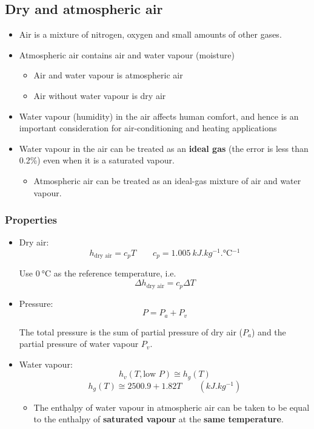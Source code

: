 \documentclass[11pt]{article}
\begin{document}
\subsection{Dry and atmospheric air}
\label{sec:orgee04d3c}
\begin{itemize}
\item Air is a mixture of nitrogen, oxygen and small amounts of other gases.
\item Atmospheric air contains air and water vapour (moisture)
\begin{itemize}
\item Air and water vapour is atmospheric air
\item Air without water vapour is dry air
\end{itemize}
\item Water vapour (humidity) in the air affects human comfort, and hence is an important consideration for air-conditioning and heating applications
\item Water vapour in the air can be treated as an \textbf{ideal gas} (the error is less than 0.2\%) even when it is a saturated vapour.
\begin{itemize}
\item Atmospheric air can be treated as an ideal-gas mixture of air and water vapour.
\end{itemize}
\end{itemize}

\subsubsection{Properties}
\label{sec:orgcea3372}
\begin{itemize}
\item Dry air:
\[h_{\text{dry air}} = c_p T \qquad c_p = \qty{1.005}{kJ.kg^{-1}.\degreeCelsius^{-1}}\]

Use \(\qty{0}{\degreeCelsius}\) as the reference temperature, i.e.
\[\Delta h_{\text{dry air}} = c_p \Delta T\]

\item Pressure:
\[P = P_a + P_v\]

The total pressure is the sum of partial pressure of dry air (\(P_a\)) and the partial pressure of water vapour \(P_v\).

\item Water vapour:
\[h_v (T, \text{low } P) \cong h_g (T)\]
\[h_g (T) \cong 2500.9 + 1.82 T \qquad (\unit{kJ.kg^{-1}})\]

\begin{itemize}
\item The enthalpy of water vapour in atmospheric air can be taken to be equal to the enthalpy of \textbf{saturated vapour} at the \textbf{same temperature}.
\end{itemize}
\end{itemize}
\end{document}

